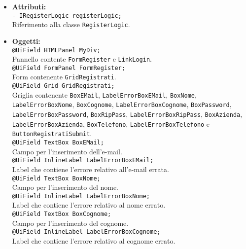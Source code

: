 {\begin{sloppypar}
{{\begin{itemize}
			\item[] \textbf{Attributi:}\\
				\texttt{- IRegisterLogic registerLogic;}\\
				Riferimento alla classe \texttt{RegisterLogic}.\\

			\item[] \textbf{Oggetti:}\\
				\texttt{@UiField HTMLPanel MyDiv;}\\
				Pannello contente \texttt{FormRegister} e \texttt{LinkLogin}.\\
				
				\texttt{@UiField FormPanel FormRegister;}\\
				Form contenente \texttt{GridRegistrati}.\\
				
				\texttt{@UiField Grid GridRegistrati;}\\
				Griglia contenente \texttt{BoxEMail}, \texttt{LabelErrorBoxEMail}, \texttt{BoxNome}, \texttt{LabelErrorBoxNome}, \texttt{BoxCognome}, \texttt{LabelErrorBoxCognome}, \texttt{BoxPassword}, \texttt{LabelErrorBoxPassword}, \texttt{BoxRipPass}, \texttt{LabelErrorBoxRipPass}, \texttt{BoxAzienda}, \texttt{LabelErrorBoxAzienda}, \texttt{BoxTelefono}, \texttt{LabelErrorBoxTelefono} e \texttt{ButtonRegistratiSubmit}.\\
				
				\texttt{@UiField TextBox BoxEMail;}\\
				Campo per l'inserimento dell'e-mail.\\
				
				\texttt{@UiField InlineLabel LabelErrorBoxEMail;}\\
				Label che contiene l'errore relativo all'e-mail errata.\\
				
				\texttt{@UiField TextBox BoxNome;}\\
				Campo per l'inserimento del nome.\\
				
				\texttt{@UiField InlineLabel LabelErrorBoxNome;}\\
				Label che contiene l'errore relativo al nome errato.\\

				\texttt{@UiField TextBox BoxCognome;}\\
				Campo per l'inserimento del cognome.\\
				
				\texttt{@UiField InlineLabel LabelErrorBoxCognome;}\\
				Label che contiene l'errore relativo al cognome errato.\\


\end{itemize}}}
\end{sloppypar}}
